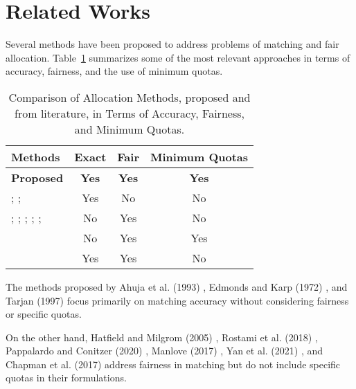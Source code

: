     \section{Related Works}
        Several methods have been proposed to address problems of matching and fair allocation. Table~\ref{tab:related_work} summarizes some of the most relevant approaches in terms of accuracy, fairness, and the use of minimum quotas.
        
        \begin{table}[ht]
          \centering
          \begin{tabular}{lccc}
            \toprule
            Methods & Exact & Fair & Minimum Quotas \\
            \midrule
            \textbf{Proposed} & \textbf{Yes} & \textbf{Yes} & \textbf{Yes} \\
            \cite{ahuja1993network}; \cite{edmonds1972theoretical}; \cite{tarjan1997dynamic} & Yes & No & No \\
            \cite{hatfield2005matching}; \cite{rostami2018matching}; \cite{pappalardo2020combining}; \cite{manlove2017algorithmics}; \cite{yan2021evolutionary}; \cite{chapman2017multi} & No & Yes & No \\
            \cite{sankar2021set} & No & Yes & Yes \\
            \cite{garcia2020fair} & Yes & Yes & No \\
            \bottomrule
          \end{tabular}
          \caption{Comparison of Allocation Methods, proposed and from literature, in Terms of Accuracy, Fairness, and Minimum Quotas.}
          \label{tab:related_work}
        \end{table}
        
        The methods proposed by Ahuja et al. (1993) \cite{ahuja1993network}, Edmonds and Karp (1972) \cite{karp1972reducibility}, and Tarjan (1997) \cite{tarjan1997dynamic} focus primarily on matching accuracy without considering fairness or specific quotas.
        
        On the other hand, Hatfield and Milgrom (2005) \cite{hatfield2005matching}, Rostami et al. (2018) \cite{rostami2018matching}, Pappalardo and Conitzer (2020) \cite{pappalardo2020combining}, Manlove (2017) \cite{manlove2017algorithmics}, Yan et al. (2021) \cite{yan2021evolutionary}, and Chapman et al. (2017) \cite{chapman2017multi} address fairness in matching but do not include specific quotas in their formulations.
        
